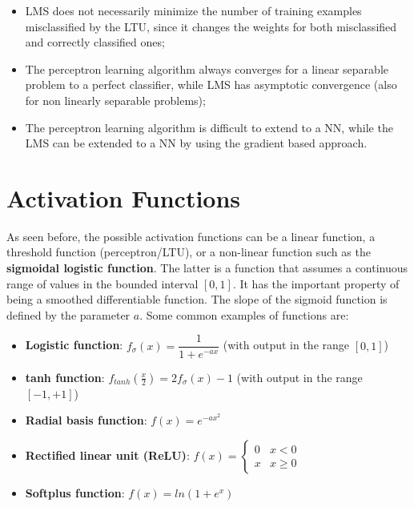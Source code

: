 \begin{itemize}
    \item LMS does not necessarily minimize the number of training examples misclassified by the LTU, since it changes the weights for both misclassified and correctly classified ones;

    \item The perceptron learning algorithm always converges for a linear separable problem to a perfect classifier, while LMS has asymptotic convergence (also for non linearly separable problems);

    \item The perceptron learning algorithm is difficult to extend to a NN, while the LMS can be extended to a NN by using the gradient based approach.
\end{itemize}

\section{Activation Functions}

As seen before, the possible activation functions can be a linear function, a threshold function (perceptron/LTU), or a non-linear function such as the \textbf{sigmoidal logistic function}. The latter is a function that assumes a continuous range of values in the bounded interval $[0,1]$. It has the important property of being a smoothed differentiable function. The slope of the sigmoid function is defined by the parameter $a$. Some common examples of functions are:

\begin{itemize}
    \item \textbf{Logistic function}: $f_{\sigma}(x) = \dfrac{1}{1+e^{-ax}}$ (with output in the range $[0,1]$)

    \item \textbf{tanh function}: $f_{tanh}(\frac{x}{2}) = 2f_{\sigma}(x) - 1$ (with output in the range $[-1,+1]$)

    \item \textbf{Radial basis function}: $f(x) = e^{-ax^2}$

    \item \textbf{Rectified linear unit (ReLU)}:
    $f(x) = \begin{cases}
            0 & x < 0 \\
            x & x \geq 0
            \end{cases}$

    \item \textbf{Softplus function}: $f(x) = ln(1+e^x)$
\end{itemize}

